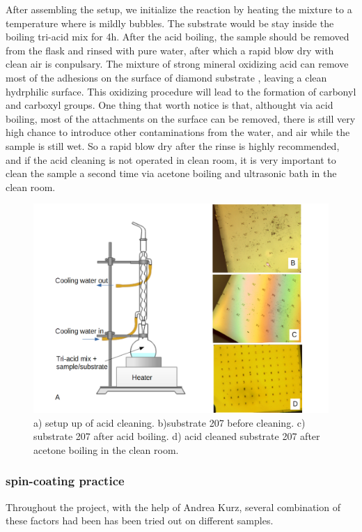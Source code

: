 After assembling the setup, we initialize the reaction by heating the mixture to a temperature where is mildly bubbles. The substrate would be stay inside the boiling tri-acid mix for 4h. After the acid boiling, the sample should be removed from the flask and rinsed with pure water, after which a rapid blow dry with clean air is conpulsary.
The mixture of strong mineral oxidizing acid can remove most of the adhesions on the surface of diamond substrate , leaving a clean hydrphilic surface. This oxidizing procedure will lead to the formation of carbonyl and carboxyl groups.
One thing that worth notice is that, althought via acid boiling, most of the attachments on the surface can be removed, there is still very high chance to introduce other contaminations from the water, and air while the sample is still wet. So a rapid blow dry after the rinse is highly recommended, and if the acid cleaning is not operated in clean room, it is very important to clean the sample a second time via acetone boiling and ultrasonic bath in the clean room.


\begin{figure}[h]
\centering
\includegraphics[width=1\linewidth]{Figures/pic/AcidCleaning}
\caption{a) setup up of acid cleaning. b)substrate 207 before cleaning. c) substrate 207 after acid boiling. d) acid cleaned substrate 207 after acetone boiling in the clean room.}
\label{fig:Acid Cleaning}
\end{figure}
 
\subsubsection{spin-coating practice}
Throughout the project, with the help of Andrea Kurz, several combination of these factors had been has been tried out on different samples.

